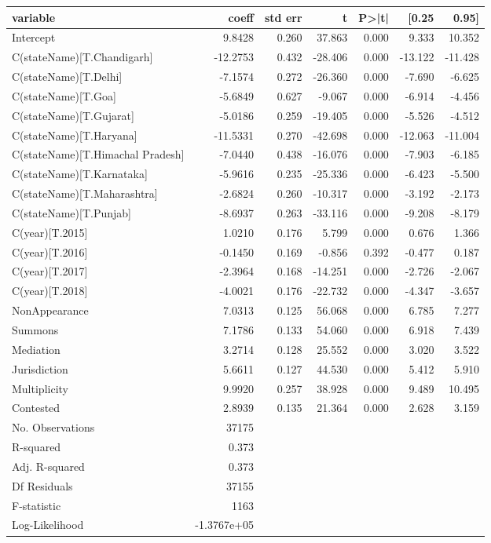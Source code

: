 {\footnotesize
  \begin{longtable}{@{}lrrrrrr@{}}
\label{tab:hearings_reg}\\
\toprule
variable & coeff & std err & t & P>|t| & [0.25 & 0.95] \\\midrule
\endhead
%
Intercept & 9.8428 & 0.260 & 37.863 & 0.000 & 9.333 & 10.352 \\
C(stateName)[T.Chandigarh] & -12.2753 & 0.432 & -28.406 & 0.000 & -13.122 & -11.428 \\
C(stateName)[T.Delhi] & -7.1574 & 0.272 & -26.360 & 0.000 & -7.690 & -6.625 \\
C(stateName)[T.Goa] & -5.6849 & 0.627 & -9.067 & 0.000 & -6.914 & -4.456 \\
C(stateName)[T.Gujarat] & -5.0186 & 0.259 & -19.405 & 0.000 & -5.526 & -4.512 \\
C(stateName)[T.Haryana] & -11.5331 & 0.270 & -42.698 & 0.000 & -12.063 & -11.004 \\
C(stateName)[T.Himachal Pradesh] & -7.0440 & 0.438 & -16.076 & 0.000 & -7.903 & -6.185 \\
C(stateName)[T.Karnataka] & -5.9616 & 0.235 & -25.336 & 0.000 & -6.423 & -5.500 \\
C(stateName)[T.Maharashtra] & -2.6824 & 0.260 & -10.317 & 0.000 & -3.192 & -2.173 \\
C(stateName)[T.Punjab] & -8.6937 & 0.263 & -33.116 & 0.000 & -9.208 & -8.179 \\
C(year)[T.2015] & 1.0210 & 0.176 & 5.799 & 0.000 & 0.676 & 1.366 \\
C(year)[T.2016] & -0.1450 & 0.169 & -0.856 & 0.392 & -0.477 & 0.187 \\
C(year)[T.2017] & -2.3964 & 0.168 & -14.251 & 0.000 & -2.726 & -2.067 \\
C(year)[T.2018] & -4.0021 & 0.176 & -22.732 & 0.000 & -4.347 & -3.657 \\
NonAppearance & 7.0313 & 0.125 & 56.068 & 0.000 & 6.785 & 7.277 \\
Summons & 7.1786 & 0.133 & 54.060 & 0.000 & 6.918 & 7.439 \\
Mediation & 3.2714 & 0.128 & 25.552 & 0.000 & 3.020 & 3.522 \\
Jurisdiction & 5.6611 & 0.127 & 44.530 & 0.000 & 5.412 & 5.910 \\
Multiplicity & 9.9920 & 0.257 & 38.928 & 0.000 & 9.489 & 10.495 \\
Contested & 2.8939 & 0.135 & 21.364 & 0.000 & 2.628 & 3.159\\
\bottomrule
No. Observations & 37175 & & & & &\\
R-squared & 0.373 & & & & & \\
Adj. R-squared& 0.373& & & & & \\
Df Residuals& 37155 & & & & &\\
F-statistic & 1163 & & & & & \\
Log-Likelihood & -1.3767e+05 & & & & & \\
\bottomrule
\end{longtable}}


